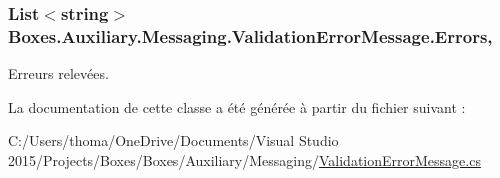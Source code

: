 \subsubsection[{\texorpdfstring{Errors}{Errors}}]{\setlength{\rightskip}{0pt plus 5cm}List$<$string$>$ Boxes.\+Auxiliary.\+Messaging.\+Validation\+Error\+Message.\+Errors\hspace{0.3cm}{\ttfamily [get]}, {}}\hypertarget{class_boxes_1_1_auxiliary_1_1_messaging_1_1_validation_error_message_ac2a0852a199c530aaf61506ff1037dac}{}\label{class_boxes_1_1_auxiliary_1_1_messaging_1_1_validation_error_message_ac2a0852a199c530aaf61506ff1037dac}


Erreurs relevées. 



La documentation de cette classe a été générée à partir du fichier suivant \+:\begin{DoxyCompactItemize}
\item 
C\+:/\+Users/thoma/\+One\+Drive/\+Documents/\+Visual Studio 2015/\+Projects/\+Boxes/\+Boxes/\+Auxiliary/\+Messaging/\hyperlink{_validation_error_message_8cs}{Validation\+Error\+Message.\+cs}\end{DoxyCompactItemize}
